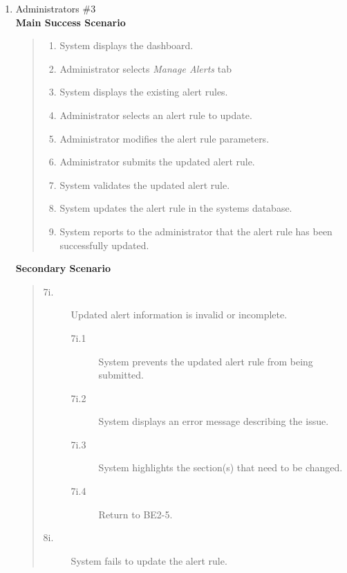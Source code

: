 \documentclass[]{article}
\begin{document}
\begin{enumerate}[{\bf BE2.}]
\begin{enumerate}[{\bf VP1.}]
			\item Administrators \#3 \\
				\textbf{Main Success Scenario} 
                    \begin{quote}
                    \begin{enumerate}[1.]
                        \item System displays the dashboard.
                        \item Administrator selects \textit{Manage Alerts} tab
                        \item System displays the existing alert rules.
                        \item Administrator selects an alert rule to update.
                        \item Administrator modifies the alert rule parameters.
                        \item Administrator submits the updated alert rule.
                        \item System validates the updated alert rule.
                        \item System updates the alert rule in the systems database.
                        \item System reports to the administrator that the alert rule has been successfully updated.
                    \end{enumerate}
                    \end{quote}
                \textbf{Secondary Scenario} 
                \begin{quote}
                    \begin{description}
                        \item[\textmd{7i.}] Updated alert information is invalid or incomplete.
                        \begin{description}
                            \item[\textmd{7i.1}] System prevents the updated alert rule from being submitted.
                            \item[\textmd{7i.2}] System displays an error message describing the issue.
                            \item[\textmd{7i.3}] System highlights the section(s) that need to be changed.
                            \item[\textmd{7i.4}] Return to BE2-5.
                        \end{description}
                        \item[\textmd{8i.}] System fails to update the alert rule.

\end{description}
\end{quote}
\end{enumerate}
\end{enumerate}
\end{document}
